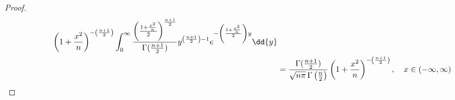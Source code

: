 \documentclass[hwnumber=4,studentnumber=20053722]{mthe353answer}
\begin{document}
\begin{questions}
\begin{solution}
\begin{proof}
\begin{align*}
            \left(1+\frac{x^2}{n}\right)^{-\left(\frac{n+1}{2}\right)}
            \int_0^\infty
            \frac{\left(\frac{1+\frac{x^2}{n}}{2}\right)^{\frac{n+1}{2}}}
              {\Gamma(\frac{n+1}{2})}
            y^{\left(\frac{n+1}{2}\right)-1}
            e^{-\left(\frac{1+\frac{x^2}{n}}{2}\right)y}
            \dd{y}\\
          &= \frac{\Gamma(\frac{n+1}{2})}{\sqrt{n\pi}\,\Gamma\left(\frac{n}{2}\right)}
            \left(1+\frac{x^2}{n}\right)^{-\left(\frac{n+1}{2}\right)},
            \quad x \in (-\infty,\infty) \qedhere
        \end{align*}
      \end{proof}
    \end{solution}
  \end{questions}
\end{document}
